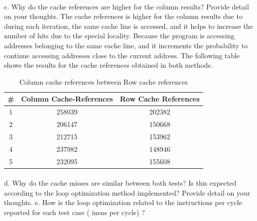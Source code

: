 \documentclass[xcolor=table]{llncs}
\begin{document}
\paragraph{}
c. Why do the cache references are higher for the column results? Provide detail on your thoughts.\newline
The cache references is higher for the column results due to during each iteration, the same cache line is accessed, and it helps to increase the number of hits due to the special locality. Because the program is accessing addresses belonging to the same cache line, and it increments the probability to continue accessing addresses close to the current address. 
The following table shows the results for the cache references obtained in both methods. 
\begin{table}[]
\centering
\caption{Column cache references between Row cache references}
\label{table4}
\begin{tabular}{ccc}
\hline
\rowcolor[HTML]{000000} 
{\color[HTML]{FFFFFF} \textbf{\#}} & {\color[HTML]{FFFFFF} \textbf{Column Cache-References}} & {\color[HTML]{FFFFFF} \textbf{Row Cache References}} \\ \hline
1 & 258039 & 202382 \\
2 & 206147 & 150668 \\
3 & 212715 & 153962 \\
4 & 237982 & 148946 \\
5 & 232095 & 155608 \\ \hline
\end{tabular}
\end{table}
\newline
\paragraph{}
d. Why do the cache misses are similar between both tests? Is this expected according to the loop optimization method implemented? Provide detail on
your thoughts.\newline
e. How is the loop optimization related to the instructions per cycle reported for each test case ( insns per cycle) ?\newline
%
\end{document}

